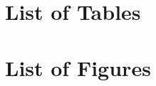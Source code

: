 


\section{List of Tables}

{\hypersetup{hidelinks}\listoftables}

\section{List of Figures}

{\hypersetup{hidelinks}\listoffigures}
